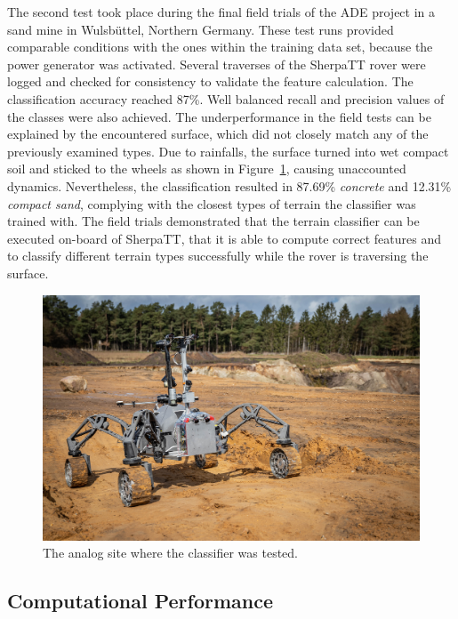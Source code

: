 The second test took place during the final field trials of the ADE project \cite{ocon2021} in a sand mine in Wulsbüttel, Northern Germany.
These test runs provided comparable conditions with the ones within the training data set, because the power generator was activated. 
Several traverses of the SherpaTT rover were logged and checked for consistency to validate the feature calculation. 
The classification accuracy reached 87\%. Well balanced recall and precision values of the classes were also achieved. 
The underperformance in the field tests can be explained by the encountered surface, which did not closely match any of the previously examined types. 
Due to rainfalls, the surface turned into wet compact soil and sticked to the wheels as shown in Figure~\ref{fig:finaltest}, causing unaccounted dynamics.
Nevertheless, the classification resulted in 87.69\% \emph{concrete} and 12.31\% \emph{compact sand}, complying with the closest types of terrain the classifier was trained with.
The field trials demonstrated that the terrain classifier can be executed on-board of SherpaTT, that it is able to compute correct features and to classify different terrain types successfully while the rover is traversing the surface.

\begin{figure}[!htbp]
    \centering
        \includegraphics[width=\columnwidth]{../figures/sandmine_v2.jpg}
    \caption{The analog site where the classifier was tested.}
    \label{fig:finaltest}
\end{figure}


\subsection{Computational Performance}

